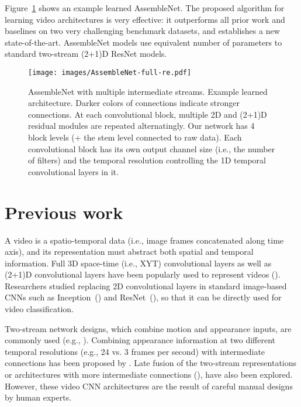 \documentclass{article} \usepackage{iclr2020_conference,times}
\begin{document}
Figure~\ref{fig:assemblenet} shows an example learned AssembleNet.
The proposed algorithm for learning video architectures is very effective: it outperforms all prior work and baselines on two very challenging benchmark datasets, and establishes a new state-of-the-art. AssembleNet models use equivalent number of parameters to standard two-stream (2+1)D ResNet models.



\begin{figure}
  \centering
\texttt{[image: images/AssembleNet-full-re.pdf]}\caption{AssembleNet with multiple intermediate streams. Example learned architecture. Darker colors of connections indicate stronger connections. At each convolutional block, multiple 2D and (2+1)D residual modules are repeated alternatingly. Our network has 4 block levels (+ the stem level connected to raw data). Each convolutional block has its own output channel size (i.e., the number of filters)  and the temporal resolution  controlling the 1D temporal convolutional layers in it.
}
  \label{fig:assemblenet}
\end{figure}




\section{Previous work}


A video is a spatio-temporal data (i.e., image frames concatenated along time axis), and its representation must abstract both spatial and temporal information. Full 3D space-time (i.e., XYT) convolutional layers as well as (2+1)D convolutional layers have been popularly used to represent videos (\citealp{tran2014c3d,carreira2017quo,tran2018closer,xie2018rethinking}). Researchers studied replacing 2D convolutional layers in standard image-based CNNs such as Inception~(\citealp{szegedy2016rethinking}) and ResNet~(\citealp{he2016deep}), so that it can be directly used for video classification.



Two-stream network designs, which combine motion and appearance inputs, are commonly used (e.g., \citealp{simonyan2014two,feichtenhofer2016tsres,feichtenhofer2017tsmult,feichtenhofer2016convolutional}). Combining appearance information at two different temporal resolutions (e.g., 24 vs. 3 frames per second) with intermediate connections has been proposed by \cite{feichtenhofer2018slowfast}. Late fusion of the two-stream representations or architectures with more intermediate connections (\citealp{diba2019holistic}), have also been explored. However, these video CNN architectures are the result of careful manual designs by human experts.
\end{document}
